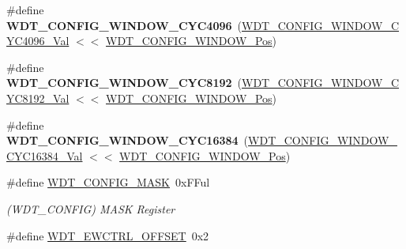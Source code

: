 \begin{DoxyCompactItemize}
\item 
\hypertarget{group___s_a_m_l21___w_d_t_ga11d4f48c8dc14110eccca72ef2ca31aa}{}\#define {\bfseries W\+D\+T\+\_\+\+C\+O\+N\+F\+I\+G\+\_\+\+W\+I\+N\+D\+O\+W\+\_\+\+C\+Y\+C4096}~(\hyperlink{group___s_a_m_l21___w_d_t_ga0197f2f68d745a025fc4a97540f34c62}{W\+D\+T\+\_\+\+C\+O\+N\+F\+I\+G\+\_\+\+W\+I\+N\+D\+O\+W\+\_\+\+C\+Y\+C4096\+\_\+\+Val} $<$$<$ \hyperlink{group___s_a_m_l21___w_d_t_gab2d3263bd9ad06e3257234d9da623ef8}{W\+D\+T\+\_\+\+C\+O\+N\+F\+I\+G\+\_\+\+W\+I\+N\+D\+O\+W\+\_\+\+Pos})\label{group___s_a_m_l21___w_d_t_ga11d4f48c8dc14110eccca72ef2ca31aa}

\item 
\hypertarget{group___s_a_m_l21___w_d_t_ga1c722b763b019e770f1d9fa950d7da28}{}\#define {\bfseries W\+D\+T\+\_\+\+C\+O\+N\+F\+I\+G\+\_\+\+W\+I\+N\+D\+O\+W\+\_\+\+C\+Y\+C8192}~(\hyperlink{group___s_a_m_l21___w_d_t_gab3c375b315a145b56484d972888b7129}{W\+D\+T\+\_\+\+C\+O\+N\+F\+I\+G\+\_\+\+W\+I\+N\+D\+O\+W\+\_\+\+C\+Y\+C8192\+\_\+\+Val} $<$$<$ \hyperlink{group___s_a_m_l21___w_d_t_gab2d3263bd9ad06e3257234d9da623ef8}{W\+D\+T\+\_\+\+C\+O\+N\+F\+I\+G\+\_\+\+W\+I\+N\+D\+O\+W\+\_\+\+Pos})\label{group___s_a_m_l21___w_d_t_ga1c722b763b019e770f1d9fa950d7da28}

\item 
\hypertarget{group___s_a_m_l21___w_d_t_ga3563f90ff3ac9cbdfd0b9f39448b3c1a}{}\#define {\bfseries W\+D\+T\+\_\+\+C\+O\+N\+F\+I\+G\+\_\+\+W\+I\+N\+D\+O\+W\+\_\+\+C\+Y\+C16384}~(\hyperlink{group___s_a_m_l21___w_d_t_gac72140ef0438e63559f1bffac329d3f9}{W\+D\+T\+\_\+\+C\+O\+N\+F\+I\+G\+\_\+\+W\+I\+N\+D\+O\+W\+\_\+\+C\+Y\+C16384\+\_\+\+Val} $<$$<$ \hyperlink{group___s_a_m_l21___w_d_t_gab2d3263bd9ad06e3257234d9da623ef8}{W\+D\+T\+\_\+\+C\+O\+N\+F\+I\+G\+\_\+\+W\+I\+N\+D\+O\+W\+\_\+\+Pos})\label{group___s_a_m_l21___w_d_t_ga3563f90ff3ac9cbdfd0b9f39448b3c1a}

\item 
\hypertarget{group___s_a_m_l21___w_d_t_gaf9e2843301ae8da8b2d8a3d2c93a3f88}{}\#define \hyperlink{group___s_a_m_l21___w_d_t_gaf9e2843301ae8da8b2d8a3d2c93a3f88}{W\+D\+T\+\_\+\+C\+O\+N\+F\+I\+G\+\_\+\+M\+A\+S\+K}~0x\+F\+Ful\label{group___s_a_m_l21___w_d_t_gaf9e2843301ae8da8b2d8a3d2c93a3f88}

\begin{DoxyCompactList}\small\item\em (W\+D\+T\+\_\+\+C\+O\+N\+F\+I\+G) M\+A\+S\+K Register \end{DoxyCompactList}\item 
\hypertarget{group___s_a_m_l21___w_d_t_ga6d95eafd522ac7c24f3c5bfd19e10af5}{}\#define \hyperlink{group___s_a_m_l21___w_d_t_ga6d95eafd522ac7c24f3c5bfd19e10af5}{W\+D\+T\+\_\+\+E\+W\+C\+T\+R\+L\+\_\+\+O\+F\+F\+S\+E\+T}~0x2\label{group___s_a_m_l21___w_d_t_ga6d95eafd522ac7c24f3c5bfd19e10af5}


\end{DoxyCompactItemize}
